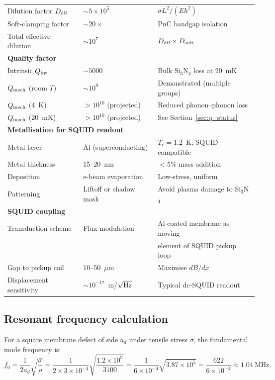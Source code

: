 \documentclass[11pt]{article}
\theoremstyle{definition}
\theoremstyle{remark}
\newcommand{\ee}[1]{\times 10^{#1}}
\newcommand{\Qmech}{Q_{\rm mech}}
\begin{document}
\begin{tcolorbox}[colback=green!5!white, colframe=green!50!black,
  title=\textbf{DFD-OPTIMISED Si$_3$N$_4$ MEMS --- FABRICATION SPEC}]
\begin{center}
\begin{tabular}{p{4.5cm}p{3cm}p{5cm}}
Dilution factor $D_{\rm dil}$ & $\sim 5\ee{5}$ & $\sigma L^2/(E h^2)$ \\
Soft-clamping factor & $\sim 20\times$ & PnC bandgap isolation \\
Total effective dilution & $\sim 10^7$ & $D_{\rm dil} \times D_{\rm soft}$ \\
\midrule
\multicolumn{3}{l}{\textbf{Quality factor}} \\
\midrule
Intrinsic $Q_{\rm int}$ & $\sim 5000$ & Bulk Si$_3$N$_4$ loss at 20~mK \\
$\Qmech$ (room $T$) & $\sim 10^9$ & Demonstrated (multiple groups) \\
$\Qmech$ (4~K) & $>10^{10}$ (projected) & Reduced phonon--phonon loss \\
$\Qmech$ (20~mK) & $>10^{10}$ (projected) & See Section~\ref{sec:q_status} \\
\midrule
\multicolumn{3}{l}{\textbf{Metallisation for SQUID readout}} \\
\midrule
Metal layer & Al (superconducting) & $T_c = 1.2$~K; SQUID-compatible \\
Metal thickness & 15--20~nm & $< 5\%$ mass addition \\
Deposition & e-beam evaporation & Low-stress, uniform \\
Patterning & Liftoff or shadow mask & Avoid plasma damage to Si$_3$N$_4$ \\
\midrule
\multicolumn{3}{l}{\textbf{SQUID coupling}} \\
\midrule
Transduction scheme & Flux modulation & Al-coated membrane as moving \\
 & & element of SQUID pickup loop \\
Gap to pickup coil & 10--50~$\mu$m & Maximise $dB/dx$ \\
Displacement sensitivity & $\sim 10^{-17}$~m/$\sqrt{\rm Hz}$ & Typical dc-SQUID readout \\
\bottomrule
\end{tabular}
\end{center}
\end{tcolorbox}

\subsection{Resonant frequency calculation}

For a square membrane defect of side $a_d$ under tensile stress $\sigma$,
the fundamental mode frequency is:
\begin{equation}
  f_0 = \frac{1}{2a_d}\sqrt{\frac{\sigma}{\rho}}
  = \frac{1}{2 \times 3\ee{-4}}\sqrt{\frac{1.2\ee{9}}{3100}}
  = \frac{1}{6\ee{-4}}\sqrt{3.87\ee{5}}
  = \frac{622}{6\ee{-4}}
  \approx 1.04~\text{MHz}.
  \label{eq:f0_calc}
\end{equation}
\end{document}
